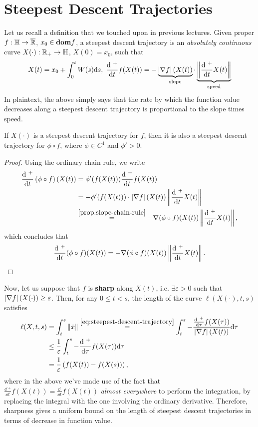 \section{Steepest Descent Trajectories}

Let us recall a definition that we touched upon in previous lectures. Given
proper $f: \mathbb{H} \to \overline{\mathbb{R}}$, $x_0 \in \textbf{dom} f$, a steepest descent
trajectory is an \textit{absolutely continuous} curve $X(\cdot): \mathbb{R}_+ \to
\mathbb{H}$, $X(0) = x_0$, such that
\begin{equation}
	X(t) = x_0 + \int_0^t W(s) \mathrm{d}{s}, \;
	\frac{ \mathrm{d}{~}^+ }{\mathrm{d}{t}} f(X(t)) = -
	\underbrace{\left| \nabla f \right|(X(t))}_{\text{slope}} \cdot
	\underbrace{\left \|  \frac{\mathrm{d}{~}^+}{\mathrm{d}{t}} X(t)  \right \|}_{\text{speed}}
	\label{eq:steepest-descent-trajectory}
\end{equation}
In plaintext, the above simply says that the rate by which the function value
decreases along a steepest descent trajectory is proportional to the slope
times speed.

\begin{cproposition}{}{}
	If $X(\cdot)$ is a steepest descent trajectory for $f$, then it is also a
	steepest descent trajectory for $\phi \circ f$, where $\phi \in C^1$ and
	$\phi' > 0$.
\end{cproposition}
\begin{proof}
	Using the ordinary chain rule, we write
	\begin{align*}
		\frac{\dd{~}^+}{\dd{t}} \left(\phi \circ f\right)(X(t)) &=
			\phi'(f(X(t))) \frac{\dd{~}^{+}}{\dd{t}} f(X(t)) \\
			&= -\phi'(f(X(t))) \cdot \abs{\grad f}(X(t))
			   \norm{\frac{\dd{~}^{+}}{\dd{t}} X(t)} \\
			&\overset{\cref{prop:slope-chain-rule}}{=}
			-\grad(\phi \circ f)(X(t)) \norm{\frac{\dd{~}^{+}}{\dd{t}} X(t)},
	\end{align*}
	which concludes that
	\[
		\frac{\mathrm{d}{~}^+}{\mathrm{d}{t}} (\phi \circ f)(X(t))
		= -\nabla (\phi \circ f)(X(t)) \left \| \frac{\mathrm{d}{~}^{+}}{\mathrm{d}{t}} X(t) \right \|.
	\]
\end{proof}

Now, let us suppose that $f$ is \textbf{sharp} along $X(t)$, i.e. $\exists
\varepsilon > 0$ such that $\left| \nabla f \right|(X(\cdot)) \geq \varepsilon$. Then,
for any $0 \leq t < s$, the length of the curve $\ell(X(\cdot), t, s)$ satisfies
\begin{align*}
	\ell(X, t, s) &= \int_t^s \norm{\dot{x}}
	\overset{\cref{eq:steepest-descent-trajectory}}{=}
	\int_t^s -\frac{\frac{\dd{~}^{+}}{\dd{\tau}} f(X(\tau))}{\abs{\grad 
	f}(X(t))}
		\dd{\tau} \\
		&\leq \frac{1}{\varepsilon} \int_t^s
			-\frac{\dd{~}^+}{\dd{\tau}} f(X(\tau)) \dd{\tau} \\
		&=\frac{1}{\varepsilon} \left(f(X(t)) - f(X(s))\right),
\end{align*}
where in the above we've made use of the fact that $\frac{\dd{~}^{+}}{\dd{t}} 
f(X(t))
= \frac{\dd{~}}{\dd{t}} f(X(t))$ \textit{almost everywhere} to perform the
integration, by replacing the integral with the one involving the ordinary
derivative.
Therefore, sharpness gives a uniform bound on the length of steepest descent
trajectories in terms of decrease in function value.

